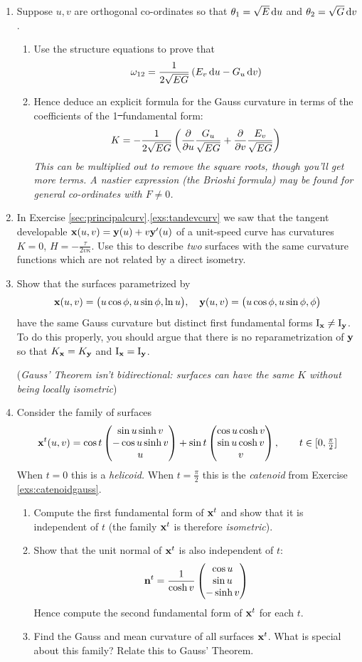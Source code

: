 \begin{exercises}{}{}
\begin{enumerate}
  
  \item\label{exs:gausscurvline} Suppose $u,v$ are orthogonal co-ordinates so that $\theta_1=\sqrt E\,{\mathrm{d} u}$ and $\theta_2=\sqrt G\,{\mathrm{d} v}$.
  \begin{enumerate}
    \item Use the structure equations to prove that
    \[\omega_{12}= \frac 1{2\sqrt{EG}}\left(E_v\,{\mathrm{d} u} -G_u\,{\mathrm{d} v}\right)\]
    \item Hence deduce an explicit formula for the Gauss curvature in terms of the coefficients of the 1\st\ fundamental form:
  	\[K=-\frac 1{2\sqrt{EG}}\left(\frac{\partial }{\partial u}\frac{G_u}{\sqrt{EG}}+\frac{\partial }{\partial v}\frac{E_v}{\sqrt{EG}}\right)\]
		\emph{This can be multiplied out to remove the square roots, though you'll get more terms. A nastier expression (the Brioshi formula) may be found for general co-ordinates with $F\neq 0$.}
		\end{enumerate}
  
  
  
  \item\label{exs:tandevkh} In Exercise \ref*{sec:principalcurv}.\ref{exs:tandevcurv} we saw that the tangent developable ${\mathbf{x}}(u,v)={\mathbf{y}}(u)+v{\mathbf{y}}'(u)$ of a unit-speed curve has curvatures $K=0$, $H=-\frac\tau{2v\kappa}$. Use this to describe \emph{two} surfaces with the same curvature functions which are not related by a direct isometry.
  
        
  \item Show that the surfaces parametrized by
  \[{\mathbf{x}}(u,v)=\bigl(u\cos\phi,u\sin\phi,\ln u\bigr),\quad {\mathbf{y}}(u,v)=\bigl(u\cos\phi,u\sin\phi,\phi\bigr)\]
  have the same Gauss curvature but distinct first fundamental forms $\mathrm{I}_{\mathbf{x}}\neq\mathrm{I}_{\mathbf{y}}$. To do this properly, you should argue that there is no reparametrization of ${\mathbf{y}}$ so that $K_{\mathbf{x}}=K_{\mathbf{y}}$ and $\mathrm{I}_{\mathbf{x}}=\mathrm{I}_{\mathbf{y}}$.\par
  (\emph{Gauss' Theorem isn't bidirectional: surfaces can have the same $K$ without being locally isometric})
  
  
  \item Consider the family of surfaces
  \[{\mathbf{x}}^t(u,v)=\cos t\begin{pmatrix}\sin u\sinh v\\-\cos u\sinh v\\u\end{pmatrix}+ \sin t\begin{pmatrix}\cos u\cosh v\\\sin u\cosh v\\v\end{pmatrix},\qquad t\in[0,\tfrac\pi 2]\]
   When $t=0$ this is a \emph{helicoid.} When $t=\frac\pi 2$ this is the \emph{catenoid} from Exercise \ref{exs:catenoidgauss}.
	\begin{enumerate}
  	\item Compute the first fundamental form of ${\mathbf{x}}^t$ and show that it is independent of $t$ (the family ${\mathbf{x}}^t$ is therefore \emph{isometric}). 
  	\item Show that the unit normal of ${\mathbf{x}}^t$ is also independent of $t$:
 	 	\[{\mathbf{n}}^t=\frac 1{\cosh v}\begin{pmatrix}\cos u\\\sin u\\-\sinh v\end{pmatrix}\]
  	Hence compute the second fundamental form of ${\mathbf{x}}^t$ for each $t$.
  	\item Find the Gauss and mean curvature of all surfaces ${\mathbf{x}}^t$. What is special about this family? Relate this to Gauss' Theorem.
\end{enumerate}


\end{enumerate}
\end{exercises}
